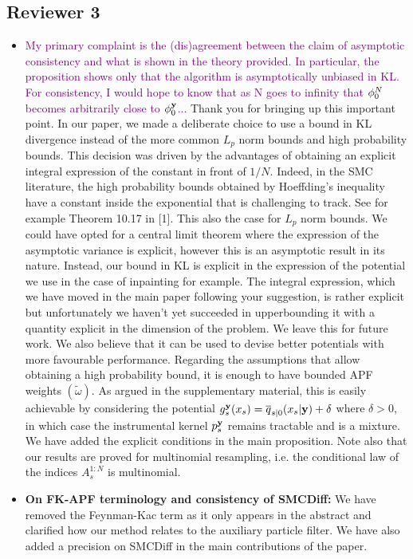 \documentclass{article}
\newcommand{\question}[1]{\textcolor{purple}{#1}}
\begin{document}
\subsection*{Reviewer 3}
\begin{itemize}
    \item \question{My primary complaint is the (dis)agreement between the claim of asymptotic consistency and what is shown in the theory provided. In particular, the proposition shows only that the algorithm is asymptotically unbiased in KL. For consistency, I would hope to know that as N goes to infinity that $\filter{0}{N}{}$ becomes arbitrarily close to $\filter{0}{\ltrmeas}{}$...} Thank you for bringing up this important point. In our paper, we made a deliberate choice to use a bound in KL divergence instead of the more common $L_p$ norm bounds and high probability bounds. This decision was driven by the advantages of obtaining an explicit integral expression of the constant in front of $1/N$.  Indeed, in the SMC literature, the high probability bounds obtained by Hoeffding's inequality have a constant inside the exponential that is challenging to track. See for example Theorem 10.17 in [1]. This also the case for $L_p$ norm bounds.  We could have opted for a central limit theorem where the expression of the asymptotic variance is explicit, however this is an asymptotic result in its nature. Instead, our bound in KL is explicit in the expression of the potential we use in the case of inpainting for example. The integral expression, which we have moved in the main paper following your suggestion, is rather explicit but unfortunately we haven't yet succeeded in upperbounding it with a quantity explicit in the dimension of the problem. We leave this for future work. We also believe that it can be used to devise better potentials with more favourable performance. Regarding the assumptions that allow obtaining a high probability bound, it is enough to have bounded APF weights $(\widetilde{\omega})$. As argued in the supplementary material, this is easily achievable by considering the potential $\pot{s}{\ltrmeas}{x_s} = \tfwtrans{s|0}{\ltrmeas}{x_s} + \delta$ where $\delta > 0$, in which case the instrumental kernel $p^{\mathbf{y}} _s$ remains tractable and is a mixture. We have added the explicit conditions in the main proposition. Note also that our results are proved for multinomial resampling, i.e. the conditional law of the indices $A^{1:N} _s$ is multinomial. 
    \item \textbf{On FK-APF terminology and consistency of SMCDiff:} We have removed the Feynman-Kac term as it only appears in the abstract and clarified how our method relates to the auxiliary particle filter. We have also added a precision on SMCDiff in the main contributions of the paper. 

\end{itemize}
\end{document}
